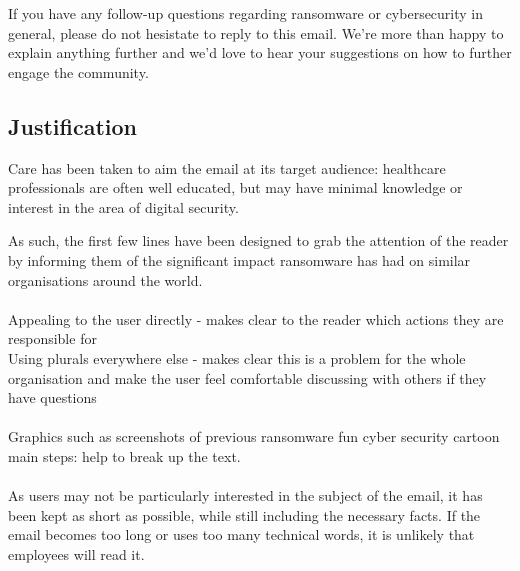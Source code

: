 \documentclass{article}
\begin{document}
If you have any follow-up questions regarding ransomware or cybersecurity in general, please do not hesistate to reply to this email. We're more than happy to explain anything further and we'd love to hear your suggestions on how to further engage the community.

\subsection{Justification}%
Care has been taken to aim the email at its target audience: healthcare professionals are often well educated, but may have minimal knowledge or interest in the area of digital security.

As such, the first few lines have been designed to grab the attention of the reader by informing them of the significant impact ransomware has had on similar organisations around the world.
\\\\
Appealing to the user directly - makes clear to the reader which actions they are responsible for\\
Using plurals everywhere else - makes clear this is a problem for the whole organisation and make the user feel comfortable discussing with others if they have questions
\\\\
Graphics such as 
	screenshots of previous ransomware
	fun cyber security cartoon
	main steps:
help to break up the text.
\\\\


As users may not be particularly interested in the subject of the email, it has been kept as short as possible, while still including the necessary facts.
If the email becomes too long or uses too many technical words, it is unlikely that employees will read it.
\end{document}
